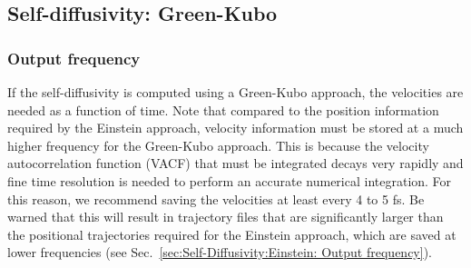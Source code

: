 \documentclass[9pt,bestpractices]{livecoms}
\begin{document}



\subsection{Self-diffusivity: Green-Kubo} \label{sec:Self-Diffusivity Green-Kubo}


\subsubsection{Output frequency} \label{sec:Self-Diffusivity:Green-Kubo: Output frequency}

If the self-diffusivity is computed using a Green-Kubo approach, the velocities are needed as a function of time. Note that compared to the position information required by the Einstein approach, velocity information must be stored at a much higher frequency for the Green-Kubo approach. This is because the velocity autocorrelation function (VACF) that must be integrated decays very rapidly and fine time resolution is needed to perform an accurate numerical integration. For this reason, we recommend saving the velocities at least every 4 to 5 fs. Be warned that this will result in trajectory files that are significantly larger than the positional trajectories required for the Einstein approach, which are saved at lower frequencies (see Sec.\ \ref{sec:Self-Diffusivity:Einstein: Output frequency}).
\end{document}
